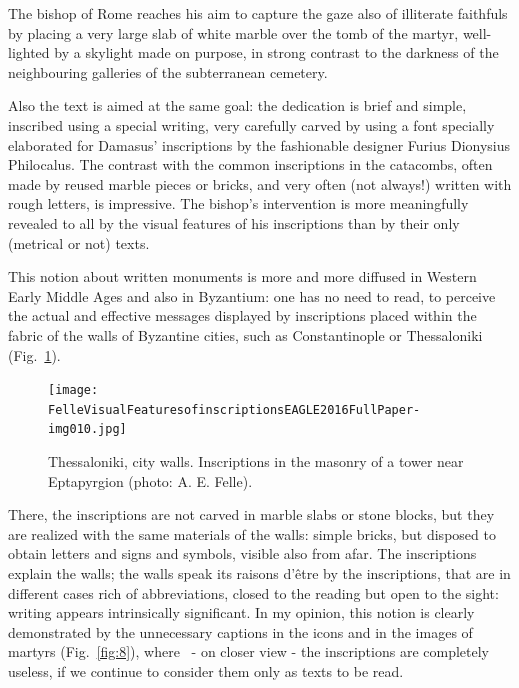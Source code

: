 \documentclass[amsthm,ebook]{saparticle}
\begin{document}
The bishop of Rome reaches his aim to capture the gaze also of illiterate faithfuls by placing a very large slab of
white marble over the tomb of the martyr, well-lighted by a skylight made on purpose, in strong contrast to the
darkness of the neighbouring galleries of the subterranean cemetery. 

Also the text is aimed at the same goal: the dedication is brief and simple, inscribed using a special writing, very
carefully carved by using a font specially elaborated for Damasus' inscriptions by the fashionable designer Furius
Dionysius Philocalus. The contrast with the common inscriptions in the catacombs, often made by reused marble pieces or
bricks, and very often (not always!) written with rough letters, is impressive. The bishop's intervention is more
meaningfully revealed to all by the visual features of his inscriptions than by their only (metrical or not) texts. 

This notion about written monuments is more and more diffused in Western Early Middle Ages and also in Byzantium: one
has no need to read, to perceive the actual and effective messages displayed by inscriptions placed within the fabric
of the walls of Byzantine cities, such as Constantinople or Thessaloniki (Fig.~\ref{fig:7}).

\begin{figure}[!bp]
\centering
 \texttt{[image: FelleVisualFeaturesofinscriptionsEAGLE2016FullPaper-img010.jpg]}
\caption{Thessaloniki, city walls. Inscriptions in the masonry of a tower near Eptapyrgion (photo: A. E. Felle).}
\label{fig:7}
\end{figure}







There, the inscriptions are not carved in marble slabs or stone blocks, but they are realized with the same materials of
the walls: simple bricks, but disposed to obtain letters and signs and symbols, visible also from afar. The
inscriptions explain the walls; the walls speak its raisons d'être by the inscriptions, that are in different cases
rich of abbreviations, closed to the reading but open to the sight: writing appears intrinsically significant. In my
opinion, this notion is clearly demonstrated by the unnecessary captions in the icons and in the images of martyrs
(Fig.~\ref{fig:8}), where \ {}- on closer view - the inscriptions are completely useless, if we continue to consider them only as
texts to be read. 
\end{document}
